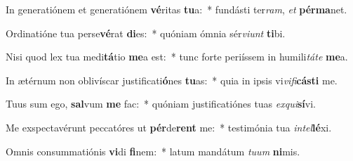 \item In generatiónem et generatiónem \textbf{vé}ritas \textbf{tu}a:~* fundásti ter\textit{ram}, \textit{et} \textbf{pér}\textbf{ma}net.
\item Ordinatióne tua perse\textbf{vé}rat \textbf{di}es:~* quóniam ómnia sér\textit{vi}\textit{unt} \textbf{ti}bi.
\item Nisi quod lex tua medi\textbf{tá}tio \textbf{me}a est:~* tunc forte periíssem in humili\textit{tá}\textit{te} \textbf{me}a.
\item In ætérnum non oblivíscar justificati\textbf{ó}nes \textbf{tu}as:~* quia in ipsis vi\textit{vi}\textit{fi}\textbf{cás}\textbf{ti} me.
\item Tuus sum ego, \textbf{sal}vum \textbf{me} fac:~* quóniam justificatiónes tuas \textit{ex}\textit{qui}\textbf{sí}vi.
\item Me exspectavérunt peccatóres ut \textbf{pér}de\textbf{rent} me:~* testimónia tua \textit{in}\textit{tel}\textbf{lé}xi.
\item Omnis consummatiónis \textbf{vi}di \textbf{fi}nem:~* latum mandátum \textit{tu}\textit{um} \textbf{ni}mis.
